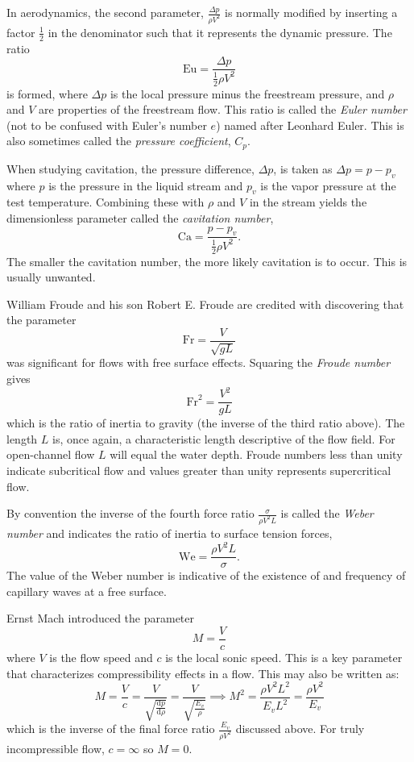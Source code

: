 In aerodynamics, the second parameter, $\frac{\Delta p}{\rho V^2}$ is normally modified by inserting a factor $\frac{1}{2}$ in the denominator such that it represents the dynamic pressure. The ratio
\[ 
\mathrm{Eu} = \frac{\Delta p}{\frac{1}{2}\rho V^2}
\]
is formed, where $\Delta p$ is the local pressure minus the freestream pressure, and $\rho$ and $V$ are properties of the freestream flow. This ratio is called the \textit{Euler number} (not to be confused with Euler's number $e$) named after Leonhard Euler. This is also sometimes called the \textit{pressure coefficient}, $C_p$. 

When studying cavitation, the pressure difference, $\Delta p$, is taken as $\Delta p = p - p_v$ where $p$ is the pressure in the liquid stream and $p_v$ is the vapor pressure at the test temperature. Combining these with $\rho$ and $V$ in the stream yields the dimensionless parameter called the \textit{cavitation number},
\[ 
\mathrm{Ca} = \frac{p - p_v}{\frac{1}{2} \rho V^2}
.\]
The smaller the cavitation number, the more likely cavitation is to occur. This is usually unwanted.

William Froude and his son Robert E. Froude are credited with discovering that the parameter
\[ 
\mathrm{Fr} = \frac{V}{\sqrt{gL}}
\]
was significant for flows with free surface effects. Squaring the \textit{Froude number} gives
\[ 
\mathrm{Fr}^2 = \frac{V^2}{gL}
\]
which is the ratio of inertia to gravity (the inverse of the third ratio above). The length $L$ is, once again, a characteristic length descriptive of the flow field. For open-channel flow $L$ will equal the water depth. Froude numbers less than unity indicate subcritical flow and values greater than unity represents supercritical flow. 

By convention the inverse of the fourth force ratio $\frac{\sigma}{\rho V^2L}$ is called the \textit{Weber number} and indicates the ratio of inertia to surface tension forces,
\[ 
\mathrm{We} = \frac{\rho V^2L}{\sigma}
.\]
The value of the Weber number is indicative of the existence of and frequency of capillary waves at a free surface.

Ernst Mach introduced the parameter
\[ 
M = \frac{V}{c}
\]
where $V$ is the flow speed and $c$ is the local sonic speed. This is a key parameter that characterizes compressibility effects in a flow. This may also be written as:
\[ 
M = \frac{V}{c} = \frac{V}{\sqrt{\frac{\mathrm{d}p}{\mathrm{d}\rho}}} = \frac{V}{\sqrt{\frac{E_v}{\rho}}} \implies M^2 = \frac{\rho V^2 L^2}{E_v L^2} = \frac{\rho V^2}{E_v}
\]
which is the inverse of the final force ratio $\frac{E_v}{\rho V^2}$ discussed above. For truly incompressible flow, $c = \infty$ so $M = 0$.
